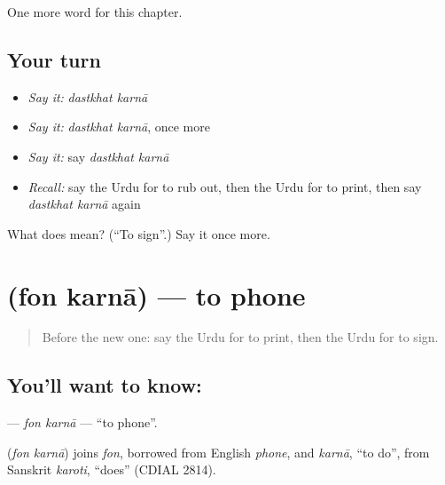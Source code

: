 \begin{grammarlens}[title={What you've built}]
One more word for this chapter.
\end{grammarlens}

\subsection*{Your turn}
\begin{itemize}
\raggedright
  \item \emph{Say it:} \emph{dastkhat karnā}
  \item \emph{Say it:} \emph{dastkhat karnā}, once more
  \item \emph{Say it:} say \emph{dastkhat karnā}
  \item \emph{Recall:} say the Urdu for to rub out, then the Urdu for to print, then say \emph{dastkhat karnā} again
\end{itemize}

\begin{tcolorbox}[breakable,colback=teal!4,colframe=teal!35!black,title={Before you move on}]
What does   mean? (\textquotedblleft{}To sign\textquotedblright{}.) Say it once more.
\end{tcolorbox}
\section[\texorpdfstring{\ur{فون} \ur{کرنا} (fon karnā)}{فون کرنا (fon karnā)}]{  (fon karnā) — to phone}

\label{lesson:UR-C150-fon-karna}



\begin{quote}
Before the new one: say the Urdu for to print, then the Urdu for to sign.
\end{quote}

\subsection*{You'll want to know:  }
\textbf{ } — \emph{fon karnā} — \textquotedblleft{}to phone\textquotedblright{}.

\begin{cousinweb}
\textbf{ } (\emph{fon karnā}) joins \emph{fon}, borrowed from English \emph{phone}, and \emph{karnā}, \textquotedblleft{}to do\textquotedblright{}, from Sanskrit \emph{karoti}, \textquotedblleft{}does\textquotedblright{} (CDIAL 2814).
\end{cousinweb}

